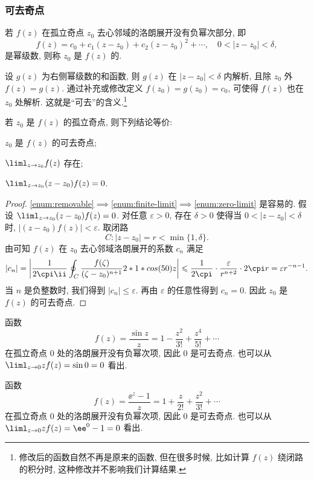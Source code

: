 \subsubsection{可去奇点}

\begin{definition}
  若 $f(z)$ 在孤立奇点 $z_0$ 去心邻域的洛朗展开没有负幂次部分, 即
  \[f(z)=c_0+c_1(z-z_0)+c_2(z-z_0)^2+\cdots,\quad 0<|z-z_0|<\delta,\]
  是幂级数, 则称 $z_0$ 是 $f(z)$ 的.
\end{definition}

设 $g(z)$ 为右侧幂级数的和函数, 则 $g(z)$ 在 $|z-z_0|<\delta$ 内解析,
且除 $z_0$ 外 $f(z)=g(z)$.
通过补充或修改定义 $f(z_0)=g(z_0)=c_0$, 可使得 $f(z)$ 也在 $z_0$ 处解析.
这就是``可去''的含义.\footnote{
  修改后的函数自然不再是原来的函数, 但在很多时候, 比如计算 $f(z)$ 绕闭路的积分时, 这种修改并不影响我们计算结果.
}

\begin{theorem}
  \label{thm:test-removable}
  若 $z_0$ 是 $f(z)$ 的孤立奇点, 则下列结论等价:
  \begin{enuma}
    \item $z_0$ 是 $f(z)$ 的可去奇点;
    \label{enum:removable}
    \item $\liml_{z\ra z_0}f(z)$ 存在;
    \label{enum:finite-limit}
    \item $\liml_{z\ra z_0}(z-z_0)f(z)=0$.
    \label{enum:zero-limit}
  \end{enuma}
\end{theorem}

\begin{proof}
  \ref{enum:removable}$\implies$\ref{enum:finite-limit}$\implies$\ref{enum:zero-limit} 是容易的.
  假设 $\liml_{z\ra z_0}(z-z_0)f(z)=0$.
  对任意 $\varepsilon>0$, 存在 $\delta>0$ 使得当 $0<|z-z_0|<\delta$ 时, $|(z-z_0)f(z)|<\varepsilon$.
  取闭路
  \[
    C:|z-z_0|=r<\min\{1,\delta\}.
  \]
  由\thmGrowUp 可知 $f(z)$ 在 $z_0$ 去心邻域洛朗展开的系数 $c_n$ 满足
  \[
     |c_n|
    =\abs{\frac1{2\cpi\ii}\oint_C \frac{f(\zeta)}{(\zeta-z_0)^{n+1}}\d z}
    \le \frac1{2\cpi} \cdot\frac{\varepsilon}{r^{n+2}}\cdot 2\cpi r
    =\varepsilon r^{-n-1}.
  \]
  当 $n$ 是负整数时, 我们得到 $|c_n|\le \varepsilon$.
  再由 $\varepsilon$ 的任意性得到 $c_n=0$.
  因此 $z_0$ 是 $f(z)$ 的可去奇点.
\end{proof}

\begin{exampleenum}
  \item 函数
  \[
    f(z)=\frac{\sin z}z=1-\dfrac{z^2}{3!}+\dfrac{z^4}{5!}+\cdots
  \]
  在孤立奇点 $0$ 处的洛朗展开没有负幂次项, 因此 $0$ 是可去奇点.
  也可以从 $\liml_{z\ra0}zf(z)=\sin 0=0$ 看出.
  \item 函数
  \[
    f(z)=\frac{\ee^z-1}z=1+\dfrac z{2!}+\dfrac{z^2}{3!}+\cdots
  \]
  在孤立奇点 $0$ 处的洛朗展开没有负幂次项, 因此 $0$ 是可去奇点.
  也可以从 $\liml_{z\ra0}zf(z)=\ee^0-1=0$ 看出.
\end{exampleenum}

